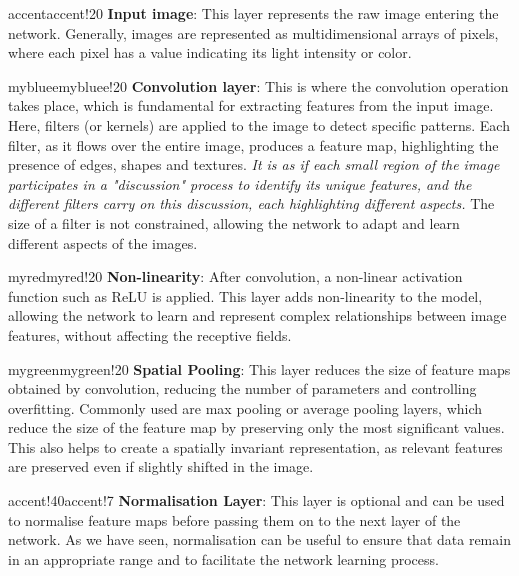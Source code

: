\begin{remark}{accent}{accent!20}
\textbf{Input image}: This layer represents the raw image entering the network. Generally, images are represented as multidimensional arrays of pixels, where each pixel has a value indicating its light intensity or color.
\end{remark}

\begin{remark}{mybluee}{mybluee!20}
\textbf{Convolution layer}: This is where the convolution operation takes place, which is fundamental for extracting features from the input image. Here, filters (or kernels) are applied to the image to detect specific patterns. Each filter, as it flows over the entire image, produces a feature map, highlighting the presence of edges, shapes and textures. \textit{It is as if each small region of the image participates in a "discussion" process to identify its unique features, and the different filters carry on this discussion, each highlighting different aspects.} The size of a filter is not constrained, allowing the network to adapt and learn different aspects of the images.
\end{remark}


\begin{remark}{myred}{myred!20}
\textbf{Non-linearity}: After convolution, a non-linear activation function such as ReLU is applied. This layer adds non-linearity to the model, allowing the network to learn and represent complex relationships between image features, without affecting the
receptive fields. 
\end{remark}

\begin{remark}{mygreen}{mygreen!20}
\textbf{Spatial Pooling}: This layer reduces the size of feature maps obtained by convolution, reducing the number of parameters and controlling overfitting. Commonly used are max pooling or average pooling layers, which reduce the size of the feature map by preserving only the most significant values. This also helps to create a spatially invariant representation, as relevant features are preserved even if slightly shifted in the image.
\end{remark}

\begin{remark}{accent!40}{accent!7}
\textbf{Normalisation Layer}: This layer is optional and can be used to normalise feature maps before passing them on to the next layer of the network. As we have seen, normalisation can be useful to ensure that data remain in an appropriate range and to facilitate the network learning process.
\end{remark}

